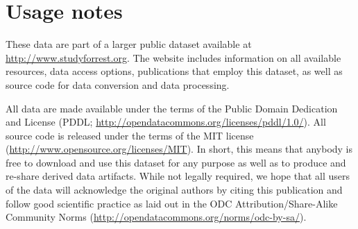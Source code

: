 \begin{table*}[t]
{\begin{tabular}{rrrrrrrrrrrrp{3cm}}
\bottomrule
\end{tabular}
}%

  \caption{
    Average group results of a searchlight-based (radius
    $\approx$\unit[2.5]{mm}) cross-validated within-subject musical genre
    classification analysis (n=20; SVM classifier; $C$ parameter scaled
    according to the norm of the data). The table lists statistics (size,
    mean/max/std accuracy) as well as localization information (coordinates in
    mm MNI152) for clusters with above-chance classification performance in the
    group (cluster-level probability $p$<0.05; FWE-corrected). Clusters are
    depicted in Figure~\ref{fig:blobs}B. Statistical
    evaluation was implemented using a bootstrapped permutation analysis, as
    described by Stelzer and colleagues \cite{SCT2013} and implemented in
    PyMVPA \cite{HHS09b}, using 50 permutation searchlight accuracy maps per
    subject, 10000 bootstrap samples, voxel-wise cluster forming threshold of
    $p$<0.001).
  Apart from two large clusters covering the majority of bilateral area for
  auditory perception and speech processing, additional clusters with
  genre-discrimitating signals were identified. These include the bilateral
  medial geniculate bodys, as well as smaller regions on the ventral visual
  pathway, frontal orbital cortex, and the cerebellum. For these regions the
  NeuroSynth database \cite{YPN+2011} reports high posterior probabilities for
  the topics: \textit{counting, motor, naming, phonology, prosody, visual, and
  vocal} (as determined with the Neurosynth term atlas shipped with NeuroDebian
  \cite{HH12}).  }

  \label{tab:grpsl}
\end{table*}



\section*{Usage notes}

These data are part of a larger public dataset available at
\url{http://www.studyforrest.org}. The website includes information on all
available resources, data access options, publications that employ this
dataset, as well as source code for data conversion and data processing.

All data are made available under the terms of the Public Domain Dedication and
License (PDDL; \url{http://opendatacommons.org/licenses/pddl/1.0/}). All source
code is released under the terms of the MIT license
(\url{http://www.opensource.org/licenses/MIT}). In short, this means that
anybody is free to download and use this dataset for any purpose as well as to
produce and re-share derived data artifacts. While not legally required, we
hope that all users of the data will acknowledge the original authors by citing
this publication and follow good scientific practice as laid out in the ODC
Attribution/Share-Alike Community Norms
(\url{http://opendatacommons.org/norms/odc-by-sa/}).


